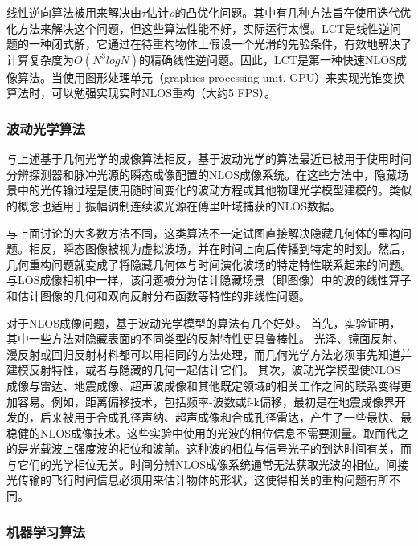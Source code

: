 \documentclass[master]{shtthesis}             %
\begin{document}
线性逆向算法被用来解决由$\tau$估计$\rho$的凸优化问题。其中有几种方法旨在使用迭代优化方法来解决这个问题\citep{gupta2012reconstruction,wu2012frequency,heide2014diffuse}，但这些算法性能不好，实际运行太慢。LCT\citep{Otoole2018}是线性逆问题的一种闭式解，它通过在待重构物体上假设一个光滑的先验条件，有效地解决了计算复杂度为$O(N^3logN)$的精确线性逆问题。因此，LCT是第一种快速NLOS成像算法。当使用图形处理单元（graphics processing unit, GPU）来实现光锥变换算法时，可以勉强实现实时NLOS重构（大约5 FPS）\citep{DBLP:journals/corr/abs-2010-12737}。

\subsubsection{波动光学算法}

与上述基于几何光学的成像算法相反，基于波动光学的算法最近已被用于使用时间分辨探测器和脉冲光源的瞬态成像配置的NLOS成像系统\citep{Liu2019,DavidB.Lindell2019,Teichman2019,Elten2019,Dove2019}。在这些方法中，隐藏场景中的光传输过程是使用随时间变化的波动方程或其他物理光学模型建模的。类似的概念也适用于振幅调制连续波光源在傅里叶域捕获的NLOS数据\citep{kadambi2013coded}。

与上面讨论的大多数方法不同，这类算法不一定试图直接解决隐藏几何体的重构问题。相反，瞬态图像被视为虚拟波场，并在时间上向后传播到特定的时刻。然后，几何重构问题就变成了将隐藏几何体与时间演化波场的特定特性联系起来的问题。与LOS成像相机中一样，该问题被分为估计隐藏场景（即图像）中的波的线性算子和估计图像的几何和双向反射分布函数等特性的非线性问题。

对于NLOS成像问题，基于波动光学模型的算法有几个好处。
首先，实验证明，其中一些方法对隐藏表面的不同类型的反射特性更具鲁棒性。
光泽、镜面反射、漫反射或回归反射材料都可以用相同的方法处理，而几何光学方法必须事先知道并建模反射特性，或者与隐藏的几何一起估计它们。
其次，波动光学模型使NLOS成像与雷达、地震成像、超声波成像和其他既定领域的相关工作之间的联系变得更加容易。例如，距离偏移技术，包括频率-波数或f-k偏移，最初是在地震成像界开发的\citep{stolt1978migration}，后来被用于合成孔径声纳\citep{callow2003signal,sheriff1992synthetic}、超声成像\citep{sheriff1992synthetic}和合成孔径雷达\citep{sheriff1992synthetic}，产生了一些最快、最稳健的NLOS成像技术\citep{DavidB.Lindell2019}。这些实验中使用的光波的相位信息不需要测量。取而代之的是光载波上强度波的相位和波前。这种波的相位与信号光子的到达时间有关，而与它们的光学相位无关。时间分辨NLOS成像系统通常无法获取光波的相位。间接光传输的飞行时间信息必须用来估计物体的形状，这使得相关的重构问题有所不同。

\subsubsection{机器学习算法}
\end{document}
